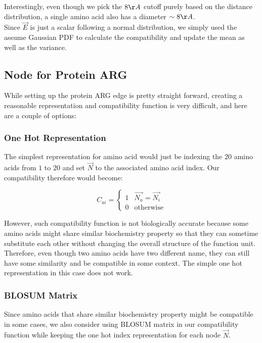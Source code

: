 Interestingly, even though we pick the $8\AA$ cutoff purely based on the distance distribution, a single amino acid also has a diameter $\sim8\AA$.\\

Since $\overrightarrow{E}$ is just a scalar following a normal distribution, we simply used the assume Gaussian PDF to calculate the compatibility and update the mean as well as the variance.

\subsection{Node for Protein ARG}

While setting up the protein ARG edge is pretty straight forward, creating a reasonable representation and compatibility function is very difficult, and here are a couple of options:

\subsubsection{One Hot Representation}
 
The simplest representation for amino acid would just be indexing the $20$ amino acids from $1$ to $20$ and set $\overrightarrow{N}$ to the associated amino acid index. Our compatibility therefore would become:
 
 \begin{equation} 
C_{ai}=\begin{cases}1 & \overrightarrow{N_a}=\overrightarrow{N_i}\\0 & \text{otherwise}\end{cases}
\end{equation}

However, such compatibility function is not biologically accurate because some amino acids might share similar biochemistry property so that they can sometime substitute each other without changing the overall structure of the function unit. Therefore, even though two amino acids have two different name, they can still have some similarity and be compatible in some context. The simple one hot representation in this case does not work.

\subsubsection{BLOSUM Matrix}

Since amino acids that share similar biochemistry property might be compatible in some cases, we also consider using BLOSUM matrix in our compatibility function while keeping the one hot index representation for each node $\overrightarrow{N}$.\\

